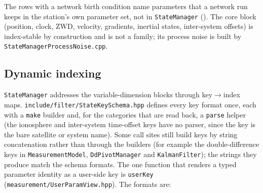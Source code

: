 The rows with a network birth condition name parameters that a network run
keeps in the station's own parameter set, not in \texttt{StateManager}
().  The core block (position, clock, ZWD, velocity,
gradients, inertial states, inter-system offsets) is index-stable by
construction and is not a family; its process noise is built by
\texttt{StateManagerProcessNoise.cpp}.

\subsection{Dynamic indexing}\label{sec:state-indexing}

\texttt{StateManager} addresses the variable-dimension blocks through
key$\to$index maps.  \texttt{include/filter/StateKeySchema.hpp} defines
every key format once, each with a \texttt{make} builder and, for the
categories that are read back, a \texttt{parse} helper (the ionosphere
and inter-system time-offset keys have no parser, since the key is the
bare satellite or system name).  Some call sites still build keys by
string concatenation rather than through the builders (for example the
double-difference keys in \texttt{MeasurementModel},
\texttt{DdPivotManager} and \texttt{KalmanFilter}); the strings they
produce match the schema formats.  The one function that renders a typed
parameter identity as a user-side key is \texttt{userKey}
(\texttt{measurement/UserParamView.hpp}).  The formats are:
